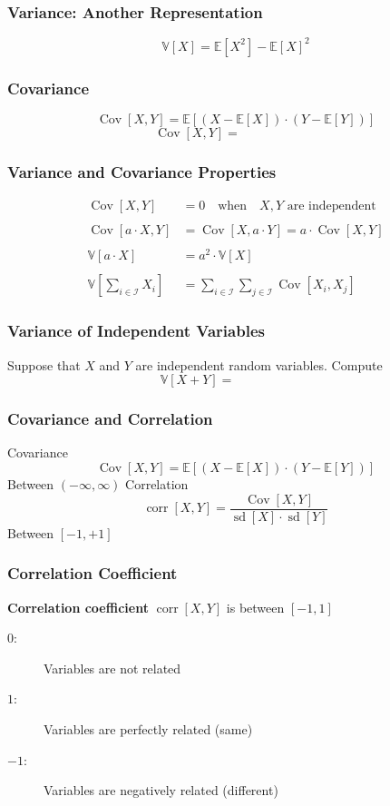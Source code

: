 \documentclass{beamer}
\newcommand{\E}[1]{\mathbb{E}\left[#1\right]}
\newcommand{\V}[1]{\mathbb{V}\left[#1\right]}
\newcommand{\sd}[1]{\operatorname{sd}\left[#1\right]}
\newcommand{\cov}[1]{\operatorname{Cov}\left[#1\right]}
\newcommand{\corr}[1]{\operatorname{corr}\left[#1\right]}
\begin{document}
\begin{frame} \frametitle{Variance: Another Representation}
 \[
  \V{ X } = \E{ X^2 } - \E{ X }^2 
 \] 
 \vspace{5cm}
\end{frame}

\begin{frame} \frametitle{Covariance}
\[ \cov{ X,Y } = \E{ (X - \E{ X }) \cdot (Y - \E{ Y })  } \]  
\vspace{2cm}
\[
  \cov{ X,Y } = \qquad \qquad \qquad 
\]
\vspace{2cm}
\end{frame}


\begin{frame} \frametitle{Variance and Covariance Properties}
\begin{align*}
  \cov{X, Y} &= 0 \quad \text{when} \quad X,Y \text{ are independent} \\
  \\
  \cov{a\cdot X, Y} &=\cov{X, a\cdot Y} = a\cdot \cov{X,Y} \\
  \\
  \V{ a \cdot X } &= a^2\cdot \V{ X } \\
  \\
  \V {  \sum_{i\in \mathcal{I}} X_i  } &= \sum_{i\in \mathcal{I}} \sum_{j \in \mathcal{I}}  \cov{  X_i, X_j  }
\end{align*}
\end{frame}

\begin{frame} \frametitle{Variance of Independent Variables}
  Suppose that $X$ and $Y$ are independent random variables. Compute
  \[
   \V{X + Y} = \qquad \qquad \qquad  
 \]
 \vspace{4cm}
\end{frame}

\begin{frame} \frametitle{Covariance and Correlation}
  Covariance
\[ \cov{ X,Y } = \E{ (X - \E{ X }) \cdot (Y - \E{ Y })  } \]  
Between $(-\infty , \infty )$
\vfill 
Correlation
\[ \corr{ X, Y } = \frac{\cov{ X,Y }}{\sd{ X }\cdot \sd{ Y }} \]
Between $[-1, +1]$
\end{frame}

\begin{frame}\frametitle{Correlation Coefficient}
    \textbf{Correlation coefficient} $\corr{ X,Y }$ is between $[-1,1]$
    \begin{description}
        \item[$0$:] Variables are not related
        \item[$1$:] Variables are perfectly  related (same)
        \item[$-1$:] Variables are negatively related (different)
    \end{description}
\end{frame}
\end{document}
